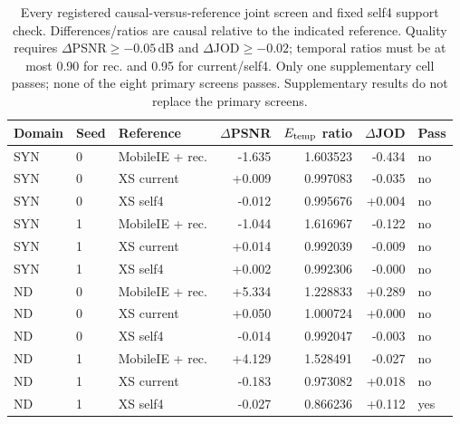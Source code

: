 \begin{table}[!htbp]
\centering\small\setlength{\tabcolsep}{4pt}
\caption{Every registered causal-versus-reference joint screen and fixed self4 support check. Differences/ratios are causal relative to the indicated reference. Quality requires $\Delta$PSNR$\geq-0.05$\,dB and $\Delta$JOD$\geq-0.02$; temporal ratios must be at most 0.90 for rec. and 0.95 for current/self4. Only one supplementary cell passes; none of the eight primary screens passes. Supplementary results do not replace the primary screens.}
\label{tab:causal-screens}
\begin{tabular}{lllr rrl}
\toprule
Domain & Seed & Reference & $\Delta$PSNR & $E_{\rm temp}$ ratio & $\Delta$JOD & Pass\\
\midrule
SYN & 0 & MobileIE + rec. & -1.635 & 1.603523 & -0.434 & no\\
SYN & 0 & XS current & +0.009 & 0.997083 & -0.035 & no\\
SYN & 0 & XS self4 & -0.012 & 0.995676 & +0.004 & no\\
SYN & 1 & MobileIE + rec. & -1.044 & 1.616967 & -0.122 & no\\
SYN & 1 & XS current & +0.014 & 0.992039 & -0.009 & no\\
SYN & 1 & XS self4 & +0.002 & 0.992306 & -0.000 & no\\
ND & 0 & MobileIE + rec. & +5.334 & 1.228833 & +0.289 & no\\
ND & 0 & XS current & +0.050 & 1.000724 & +0.000 & no\\
ND & 0 & XS self4 & -0.014 & 0.992047 & -0.003 & no\\
ND & 1 & MobileIE + rec. & +4.129 & 1.528491 & -0.027 & no\\
ND & 1 & XS current & -0.183 & 0.973082 & +0.018 & no\\
ND & 1 & XS self4 & -0.027 & 0.866236 & +0.112 & yes\\
\bottomrule
\end{tabular}
\end{table}
